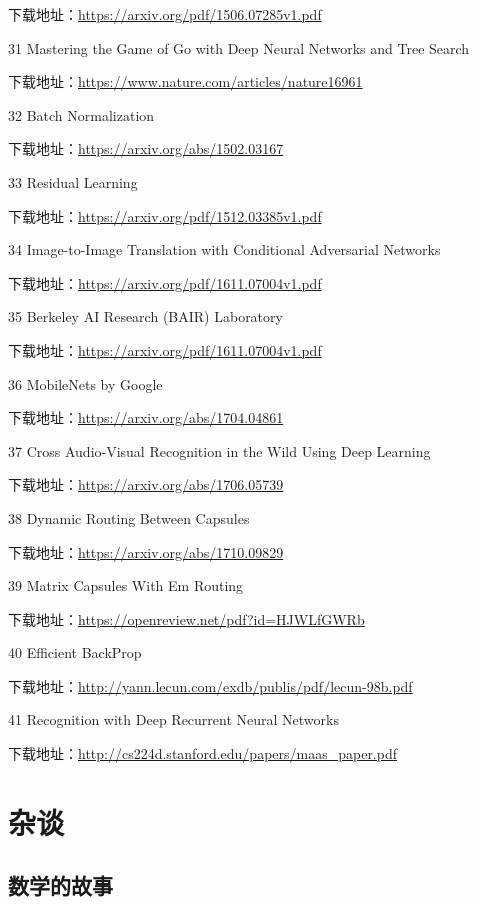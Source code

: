 \documentclass[]{ctexbook}
\begin{document}
下载地址：\url{https://arxiv.org/pdf/1506.07285v1.pdf}

31 Mastering the Game of Go with Deep Neural Networks and Tree Search

下载地址：\url{https://www.nature.com/articles/nature16961}

32 Batch Normalization

下载地址：\url{https://arxiv.org/abs/1502.03167}

33 Residual Learning

下载地址：\url{https://arxiv.org/pdf/1512.03385v1.pdf}

34 Image-to-Image Translation with Conditional Adversarial Networks

下载地址：\url{https://arxiv.org/pdf/1611.07004v1.pdf}

35 Berkeley AI Research (BAIR) Laboratory

下载地址：\url{https://arxiv.org/pdf/1611.07004v1.pdf}

36 MobileNets by Google

下载地址：\url{https://arxiv.org/abs/1704.04861}

37 Cross Audio-Visual Recognition in the Wild Using Deep Learning

下载地址：\url{https://arxiv.org/abs/1706.05739}

38 Dynamic Routing Between Capsules

下载地址：\url{https://arxiv.org/abs/1710.09829}

39 Matrix Capsules With Em Routing

下载地址：\url{https://openreview.net/pdf?id=HJWLfGWRb}

40 Efficient BackProp

下载地址：\url{http://yann.lecun.com/exdb/publis/pdf/lecun-98b.pdf}

41 Recognition with Deep Recurrent Neural Networks

下载地址：\url{http://cs224d.stanford.edu/papers/maas_paper.pdf}

\hypertarget{ux6742ux8c08}{%
\chapter{杂谈}\label{ux6742ux8c08}}

\hypertarget{ux6570ux5b66ux7684ux6545ux4e8b}{%
\section{数学的故事}\label{ux6570ux5b66ux7684ux6545ux4e8b}}
\end{document}
